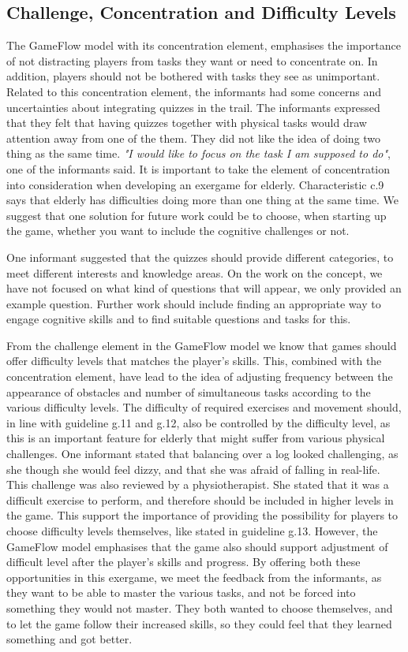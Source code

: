 \subsection{Challenge, Concentration and Difficulty Levels}

The GameFlow model with its concentration element, emphasises the importance of not distracting players from tasks they want or need to concentrate on. In addition, players should not be bothered with tasks they see as unimportant. Related to this concentration element, the informants had some concerns and uncertainties about integrating quizzes in the trail. The informants expressed that they felt that having quizzes together with physical tasks would draw attention away from one of the them. They did not like the idea of doing two thing as the same time. \emph{"I would like to focus on the task I am supposed to do"}, one of the informants said. It is important to take the element of concentration into consideration when developing an exergame for elderly. Characteristic c.9 says that elderly has difficulties doing more than one thing at the same time. We suggest that one solution for future work could be to choose, when starting up the game, whether you want to include the cognitive challenges or not. 

One informant suggested that the quizzes should provide different categories, to meet different interests and knowledge areas. On the work on the concept, we have not focused on what kind of questions that will appear, we only provided an example question. Further work should include finding an appropriate way to engage cognitive skills and to find suitable questions and tasks for this.

From the challenge element in the GameFlow model we know that games should offer difficulty levels that matches the player's skills. This, combined with the concentration element, have lead to the idea of adjusting frequency between the appearance of obstacles and number of simultaneous tasks according to the various difficulty levels. The difficulty of required exercises and movement should, in line with guideline g.11 and g.12, also be controlled by the difficulty level, as this is an important feature for elderly that might suffer from various physical challenges. One informant stated that balancing over a log looked challenging, as she though she would feel dizzy, and that she was afraid of falling in real-life. This challenge was also reviewed by a physiotherapist. She stated that it was a difficult exercise to perform, and therefore should be included in higher levels in the game. This support the importance of providing the possibility for players to choose difficulty levels themselves, like stated in guideline g.13. However, the GameFlow model emphasises that the game also should support adjustment of difficult level after the player's skills and progress. By offering both these opportunities in this exergame, we meet the feedback from the informants, as they want to be able to master the various tasks, and not be forced into something they would not master. They both wanted to choose themselves, and to let the game follow their increased skills, so they could feel that they learned something and got better.  

